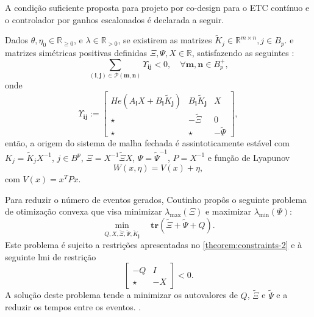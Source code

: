 A condição suficiente proposta para projeto por co-design para o ETC contínuo  e o controlador por ganhos escalonados é declarada a seguir.
\begin{theorem}
  \label{theorem:constraints-2}
  Dados $\theta, \eta_0 \in \mathbb{R}_{\geq 0}$, e $\lambda \in \mathbb{R}_{> 0}$, se existirem as matrizes $\tilde{K}_j \in \mathbb{R}^{m \times n}, j \in B_p$. e matrizes simétricas positivas definidas $\Xi, \Psi, X \in \mathbb{R}$, satisfazendo as seguintes :
  \begin{equation}
    \sum_{(\mathbf{i}, \mathbf{j}) \in \mathscr{P} (\mathbf{m},\mathbf{n})} \Upsilon_{\mathbf{ij}} < 0, \quad \forall \mathbf{m}, \mathbf{n} \in B_p^+,
    \label{eq:2.18}
  \end{equation}
  onde
  \begin{equation}
    \Upsilon_{\mathbf{ij}} :=
    \begin{bmatrix}
      He(A_\mathbf{i}X +B_\mathbf{i}\tilde{K}_\mathbf{j}) & B_\mathbf{i}\tilde{K}_{\mathbf{j}} & X             \\
      \star                                               & -\tilde{\Xi}                       & 0             \\
      \star                                               & \star                              & -\tilde{\Psi}
    \end{bmatrix},
  \end{equation}
  então, a origem do sistema de malha fechada é assintoticamente estável com $K_j = \tilde{K}_jX^{-1}$, $j \in B^p$, $\Xi= X^{-1}\tilde{\Xi}X$, $\Psi = \tilde{\Psi}^{-1}$, $P = X^{-1}$ e função de Lyapunov
  \begin{equation}
    W(x, \eta) = V(x) + \eta,
  \end{equation}
  com $V(x)=x^TPx$.
\end{theorem}

Para reduzir o número de eventos gerados, Coutinho propôs o seguinte problema de otimização convexa que visa minimizar $\lambda_{\max} (\Xi)$ e maximizar $\lambda_{\min}(\Psi)$: \begin{equation}\underset{Q, X, \tilde{\Xi}, \tilde{\Psi}, \tilde{K}_\mathbf{j}}\min \quad \mathbf{tr}(\tilde{\Xi} + \tilde{\Psi} + Q).\end{equation} Este problema é sujeito a restrições apresentadas no \autoref{theorem:constraints-2} e à seguinte \acrshort{lmi} de restrição \begin{equation}\begin{bmatrix}
  -Q & I \\ \star & -X
\end{bmatrix} < 0.\end{equation} A solução deste problema tende a minimizar os autovalores de $Q$, $\tilde{\Xi}$ e $\tilde{\Psi}$ e a reduzir os tempos entre os eventos. \cite{coutinho2021}.

